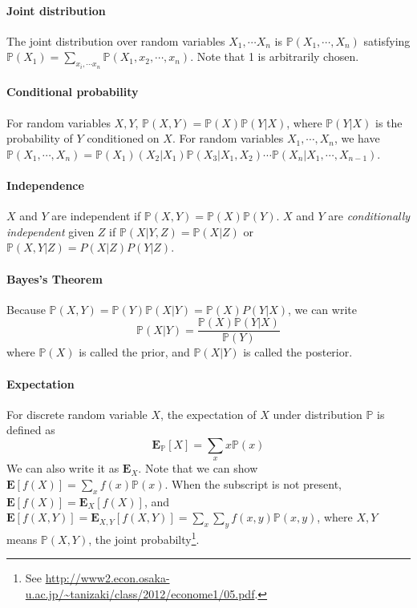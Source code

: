 \documentclass[12pt]{article}
\renewcommand{\P}{\mathbb{P}}
\newcommand{\E}{\bm{E}}
\theoremstyle{definition}
\begin{document}
\paragraph{Joint distribution} The joint distribution over random variables $X_1,\cdots X_n$ is $\P(X_1,\cdots,X_n)$ satisfying $\P(X_1)=\sum_{x_i,\cdots x_n}\P(X_1,x_2,\cdots,x_n)$. Note that 1 is arbitrarily chosen.

\paragraph{Conditional probability} For random variables $X, Y$, $\P(X,Y)=\P(X)\P(Y|X)$, where $\P(Y|X)$ is the probability of $Y$ conditioned on $X$. For random variables $X_1,\cdots,X_n$, we have $\P(X_1,\cdots,X_n)=\P(X_1)(X_2|X_1)\P(X_3|X_1,X_2)\cdots\P(X_n|X_1,\cdots,X_{n-1})$.

\paragraph{Independence} $X$ and $Y$ are independent if $\P(X,Y)=\P(X)\P(Y)$. $X$ and $Y$ are \emph{conditionally independent} given $Z$ if $\P(X|Y,Z)=\P(X|Z)$ or $\P(X,Y|Z)=P(X|Z)P(Y|Z)$.

\paragraph{Bayes's Theorem} Because $\P(X,Y)=\P(Y)\P(X|Y)=\P(X)P(Y|X)$, we can write
\begin{equation}
  \P(X|Y) = \frac{\P(X)\P(Y|X)}{\P(Y)}
\end{equation}
where $\P(X)$ is called the prior, and $\P(X|Y)$ is called the posterior.

\paragraph{Expectation} For discrete random variable $X$, the expectation of $X$ under distribution $\P$ is defined as
\begin{equation}
  \E_{\P}[X]=\sum_{x}x\P(x)
\end{equation}
We can also write it as $\E_{X}$. Note that we can show $\E[f(X)]=\sum_{x}f(x)\P(x)$. When the subscript is not present, $\E[f(X)]=\E_{X}[f(X)]$, and $\E[f(X,Y)]=\E_{X,Y}[f(X,Y)]=\sum_{x}\sum_{y}f(x,y)\P(x,y)$, where $X,Y$ means $\P(X,Y)$, the joint probabilty\footnote{See \url{http://www2.econ.osaka-u.ac.jp/~tanizaki/class/2012/econome1/05.pdf}.}.
\end{document}
